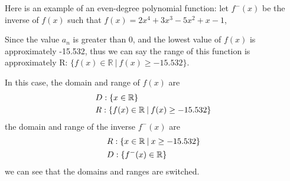 \documentclass[12pt, titlepage]{article}
\begin{document}
        Here is an example of an even-degree polynomial function:
        let $f^-(x)$ be the inverse of $f(x)$ such that $f(x)=2x^4 + 3x^3 - 5x^2 + x - 1$,
        \begin{center}
        \end{center}

        \newpage
        Since the value $a_n$ is greater than 0, and the lowest value of $f(x)$ is approximately -15.532, thus we can say the range of this function is approximately R: $\{f(x)\in\mathbb{R} \:|\: f(x)\geq-15.532\}$.

        In this case, the domain and range of $f(x)$ are
        \begin{align*}
            \centering
            &D: \{x\in\mathbb{R}\}\\
            &R: \{f(x)\in\mathbb{R} \:|\: f(x)\geq-15.532\}
        \end{align*}
        the domain and range of the inverse $f^-(x)$ are
        \begin{align*}
            \centering
            &R: \{x\in\mathbb{R} \:|\: x\geq-15.532\}\\
            &D: \{f^-(x)\in\mathbb{R}\}
        \end{align*}
        we can see that the domains and ranges are switched.

        \newpage
\end{document}
